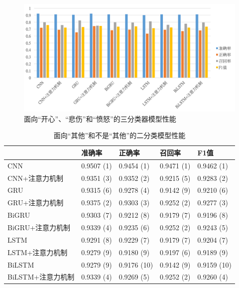 \begin{figure}[H]
  \centering
  \includegraphics[width=\textwidth]{img/exp_context_emo_b_result_bar.png}
  \caption{面向“开心”、“悲伤”和“愤怒”的三分类器模型性能}
  \label{fig:exp_context_emo_b_result_bar}
\end{figure}

\begin{table}[htb]
  \centering
  \begin{minipage}[t]{\linewidth}
  \caption{面向“其他”和不是“其他”的二分类模型性能}
  \label{tab:exp_context_emo_tri_result}
    \begin{tabularx}{\linewidth}{X|llll}
    \toprule[1.5pt]
    & 准确率 & 正确率 & 召回率 & F1值 \\
    \hline
    CNN & 0.9507 (1) & 0.9454 (1) & 0.9471 (1) & 0.9462 (1) \\ %
    CNN+注意力机制 & 0.9351 (3) & 0.9352 (2) & 0.9215 (5) & 0.9283 (2) \\ %
    \hline
    GRU & 0.9315 (6) & 0.9278 (4) & 0.9142 (9) & 0.9210 (6) \\ %
    GRU+注意力机制 & 0.9375 (2) & 0.9303 (3) & 0.9252 (2) & 0.9277 (3) \\ %
    \hline
    BiGRU & 0.9303 (7) & 0.9212 (8) & 0.9179 (7) & 0.9196 (8) \\ %
    BiGRU+注意力机制 & 0.9339 (4) & 0.9235 (6) & 0.9252 (2) & 0.9243 (5) \\ %
    \hline
    LSTM & 0.9291 (8) & 0.9229 (7) & 0.9179 (7) & 0.9204 (7) \\ %
    LSTM+注意力机制 & 0.9279 (9) & 0.9180 (9) & 0.9197 (6) & 0.9189 (9) \\ %
    \hline
    BiLSTM & 0.9279 (9) & 0.9176 (10) & 0.9142 (9) & 0.9159 (10) \\ %
    BiLSTM+注意力机制 & 0.9339 (4) & 0.9269 (5) & 0.9252 (2) & 0.9260 (4) \\ %
    \bottomrule[1.5pt]
    \end{tabularx}
  \end{minipage}
\end{table}


